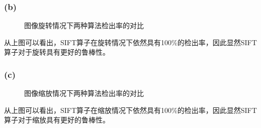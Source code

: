 \documentclass[a4paper, UTF8]{ctexrep}
\begin{document}
			\subsubsection{(b)}
				\begin{figure}[htbp!]
					\centering
					\caption{图像旋转情况下两种算法检出率的对比}
				\end{figure}
				从上图可以看出，SIFT算子在旋转情况下依然具有100\%的检出率，因此显然SIFT算子对于旋转具有更好的鲁棒性。
			\subsubsection{(c)}
				\begin{figure}[htbp!]
					\centering
					\caption{图像缩放情况下两种算法检出率的对比}
				\end{figure}
				从上图可以看出，SIFT算子在缩放情况下依然具有100\%的检出率，因此显然SIFT算子对于缩放具有更好的鲁棒性。
			\clearpage
\end{document}
